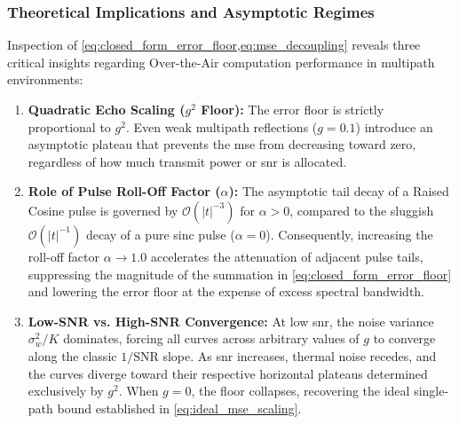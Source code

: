 \documentclass[Markos_Delaportas_1316.tex]{subfiles}
\begin{document}
\subsubsection{Theoretical Implications and Asymptotic Regimes}
\label{subsubsec:implications_asymptotic_regimes}
Inspection of \cref{eq:closed_form_error_floor,eq:mse_decoupling}
reveals three critical insights regarding Over-the-Air
computation performance in multipath environments:
\begin{enumerate}[leftmargin=*]
    \item \textbf{Quadratic Echo Scaling ($g^2$ Floor):} The error
        floor is strictly proportional to $g^2$. Even weak
        multipath reflections ($g = 0.1$) introduce an asymptotic
        plateau that prevents the \gls{mse} from decreasing toward zero,
        regardless of how much transmit power or \gls{snr} is allocated.
    \item \textbf{Role of Pulse Roll-Off Factor ($\alpha$):} The
        asymptotic tail decay of a Raised Cosine pulse is
        governed by $\mathcal{O}(|t|^{-3})$ for $\alpha > 0$,
        compared to the sluggish $\mathcal{O}(|t|^{-1})$ decay of a pure
        sinc pulse ($\alpha = 0$). Consequently, increasing the
        roll-off factor $\alpha \to 1.0$ accelerates the attenuation of
        adjacent pulse tails, suppressing the magnitude of the
        summation in \cref{eq:closed_form_error_floor} and lowering the
        error floor at the expense of excess spectral bandwidth.
    \item \textbf{Low-SNR vs. High-SNR Convergence:} At low
        \gls{snr}, the noise variance $\sigma_w^2 / K$ dominates,
        forcing all curves across arbitrary values of $g$ to converge
        along the classic $1/\text{SNR}$ slope. As \gls{snr} increases,
        thermal noise recedes, and the curves diverge toward their
        respective horizontal plateaus determined exclusively by $g^2$.
        When $g = 0$, the floor collapses, recovering the ideal
        single-path bound established in \cref{eq:ideal_mse_scaling}.
\end{enumerate}
\end{document}
